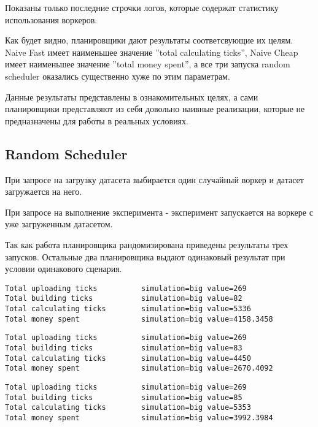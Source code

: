 Показаны только последние строчки логов, которые содержат статистику использования воркеров.

Как будет видно, планировщики дают результаты соответсвующие их целям. Naive Fast имеет наименьшее значение ''total calculating ticks'', Naive Cheap имеет наименьшее значение ''total money spent'', а все три запуска random scheduler оказались существенно хуже по этим параметрам.

Данные результаты представлены в ознакомительных целях, а сами планировщики представляют из себя довольно наивные реализации, которые не предназначены для работы в реальных условиях.

\subsection{Random Scheduler}

При запросе на загрузку датасета выбирается один случайный воркер и датасет загружается на него.

При запросе на выполнение эксперимента - эксперимент запускается на воркере с уже загруженным датасетом.

Так как работа планировщика рандомизирована приведены результаты трех запусков. Остальные два планировщика выдают одинаковый результат при условии одинакового сценария.

\begin{lstlisting}[caption=Random Scheduler: запуск 1]
Total uploading ticks          simulation=big value=269
Total building ticks           simulation=big value=82
Total calculating ticks        simulation=big value=5336
Total money spent              simulation=big value=4158.3458
\end{lstlisting}

\begin{lstlisting}[caption=Random Scheduler: запуск 2]
Total uploading ticks          simulation=big value=269
Total building ticks           simulation=big value=83
Total calculating ticks        simulation=big value=4450
Total money spent              simulation=big value=2670.4092
\end{lstlisting}

\begin{lstlisting}[caption=Random Scheduler: запуск 3]
Total uploading ticks          simulation=big value=269
Total building ticks           simulation=big value=85
Total calculating ticks        simulation=big value=5353
Total money spent              simulation=big value=3992.3984
\end{lstlisting}

